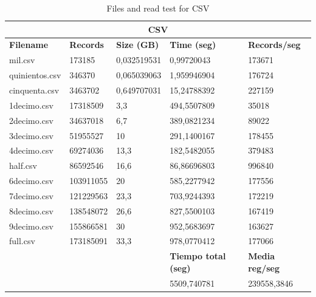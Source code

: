 \begin{table}[htp!]
	\centering
	\caption{Files and read test for \gls{CSV}}
	\label{velocidadCSVEN}
	\begin{tabular}{|l|l|l|l|l|}
		\hline
		\multicolumn{5}{|c|}{\textbf{CSV}}                                                                               \\ \hline
		\textbf{Filename} & \textbf{Records} & \textbf{Size (GB)} & \textbf{Time (seg)} & \textbf{Records/seg} \\ \hline
		mil.csv         & 173185             & 0,032519531     & 0,99720043                 & 173671                     \\ \hline
		quinientos.csv  & 346370             & 0,065039063     & 1,959946904                & 176724                     \\ \hline
		cinquenta.csv   & 3463702            & 0,649707031     & 15,24788392                & 227159                     \\ \hline
		1decimo.csv     & 17318509           & 3,3             & 494,5507809                & 35018                      \\ \hline
		2decimo.csv     & 34637018           & 6,7             & 389,0821234                & 89022                      \\ \hline
		3decimo.csv     & 51955527           & 10              & 291,1400167                & 178455                     \\ \hline
		4decimo.csv     & 69274036           & 13,3            & 182,5482055                & 379483                     \\ \hline
		half.csv        & 86592546           & 16,6            & 86,86696803                & 996840                     \\ \hline
		6decimo.csv     & 103911055          & 20              & 585,2277942                & 177556                     \\ \hline
		7decimo.csv     & 121229563          & 23,3            & 703,9244393                & 172219                     \\ \hline
		8decimo.csv     & 138548072          & 26,6            & 827,5500103                & 167419                     \\ \hline
		9decimo.csv     & 155866581          & 30              & 952,5683697                & 163627                     \\ \hline
		full.csv        & 173185091          & 33,3            & 978,0770412                & 177066                     \\ \hline
		&                    &                      & \textbf{Tiempo total (seg)} & \textbf{Media reg/seg}     \\ \hline
		&                    &                 & 5509,740781                & 239558,3846                \\ \hline
	\end{tabular}
\end{table}

